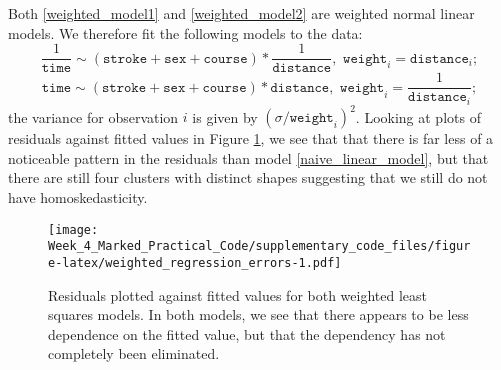 \documentclass[a4paper,11pt]{article}
\begin{document}
Both \eqref{weighted_model1} and \eqref{weighted_model2} are weighted normal linear models. We therefore fit the following models to the data:
\begin{equation}
  \frac{1}{\texttt{time}} \sim (\texttt{stroke} + \texttt{sex} + \texttt{course}) * \frac{1}{\texttt{distance}} , \texttt{ weight}_i = \texttt{distance}_i ;
\end{equation}
\begin{equation}
  \texttt{time} \sim (\texttt{stroke} + \texttt{sex} + \texttt{course}) * \texttt{distance} ,  \texttt{ weight}_i = \frac{1}{\texttt{distance}_i};
\end{equation}
the variance for observation $i$ is given by $(\sigma/\texttt{weight}_i)^2$.
Looking at plots of residuals against fitted values in Figure \ref{weighted_least_squares_regression_errors}, we see that that there is far less of a noticeable pattern in the residuals than model \eqref{naive_linear_model}, but that there are still four clusters with distinct shapes suggesting that we still do not have homoskedasticity.

\begin{figure}
  \centering
  \texttt{[image: Week\_4\_Marked\_Practical\_Code/supplementary\_code\_files/figure-latex/weighted\_regression\_errors-1.pdf]}
  \caption{Residuals plotted against fitted values for both weighted least squares models. In both models, we see that there appears to be less dependence on the fitted value, but that the dependency has not completely been eliminated.}
  \label{weighted_least_squares_regression_errors}
\end{figure}
\end{document}
